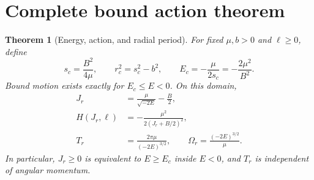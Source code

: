 \documentclass[10pt]{article}
\newtheorem{theorem}{Theorem}
\begin{document}
\section{Complete bound action theorem}
\begin{theorem}[Energy, action, and radial period]\label{thm:core}
For fixed \(\mu,b>0\) and \(\ell\geq0\), define
\begin{equation}\label{eq:circ}
 s_c=\frac{B^2}{4\mu},\qquad r_c^2=s_c^2-b^2,
 \qquad E_c=-\frac{\mu}{2s_c}=-\frac{2\mu^2}{B^2}.
\end{equation}
Bound motion exists exactly for \(E_c\leq E<0\).  On this domain,
\begin{align}
 J_r&=\frac{\mu}{\sqrt{-2E}}-\frac B2,\label{eq:J}\\
 H(J_r,\ell)&=-\frac{\mu^2}{2(J_r+B/2)^2},\label{eq:HJ}\\
 T_r&=\frac{2\pi\mu}{(-2E)^{3/2}},\qquad
 \Omega_r=\frac{(-2E)^{3/2}}{\mu}.\label{eq:Tr}
\end{align}
In particular, \(J_r\geq0\) is equivalent to \(E\geq E_c\) inside
\(E<0\), and \(T_r\) is independent of angular momentum.
\end{theorem}
\end{document}
